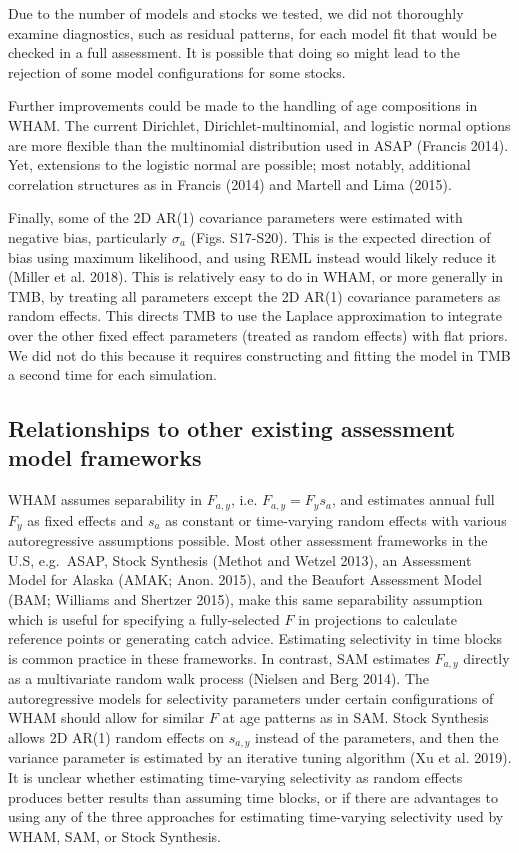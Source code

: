 \documentclass[]{article}
\begin{document}
Due to the number of models and stocks we tested, we did not thoroughly
examine diagnostics, such as residual patterns, for each model fit that
would be checked in a full assessment. It is possible that doing so
might lead to the rejection of some model configurations for some
stocks.

Further improvements could be made to the handling of age compositions
in WHAM. The current Dirichlet, Dirichlet-multinomial, and logistic
normal options are more flexible than the multinomial distribution used
in ASAP (Francis 2014). Yet, extensions to the logistic normal are
possible; most notably, additional correlation structures as in Francis
(2014) and Martell and Lima (2015).

Finally, some of the 2D AR(1) covariance parameters were estimated with
negative bias, particularly \(\sigma_a\) (Figs. S17-S20). This is the
expected direction of bias using maximum likelihood, and using REML
instead would likely reduce it (Miller et al. 2018). This is relatively
easy to do in WHAM, or more generally in TMB, by treating all parameters
except the 2D AR(1) covariance parameters as random effects. This
directs TMB to use the Laplace approximation to integrate over the other
fixed effect parameters (treated as random effects) with flat priors. We
did not do this because it requires constructing and fitting the model
in TMB a second time for each simulation.

\hypertarget{relationships-to-other-existing-assessment-model-frameworks}{%
\subsection{Relationships to other existing assessment model
frameworks}\label{relationships-to-other-existing-assessment-model-frameworks}}

WHAM assumes separability in \(F_{a,y}\), i.e. \(F_{a,y} = F_y s_a\),
and estimates annual full \(F_y\) as fixed effects and \(s_a\) as
constant or time-varying random effects with various autoregressive
assumptions possible. Most other assessment frameworks in the U.S,
e.g.~ASAP, Stock Synthesis (Methot and Wetzel 2013), an Assessment Model
for Alaska (AMAK; Anon. 2015), and the Beaufort Assessment Model (BAM;
Williams and Shertzer 2015), make this same separability assumption
which is useful for specifying a fully-selected \(F\) in projections to
calculate reference points or generating catch advice. Estimating
selectivity in time blocks is common practice in these frameworks. In
contrast, SAM estimates \(F_{a,y}\) directly as a multivariate random
walk process (Nielsen and Berg 2014). The autoregressive models for
selectivity parameters under certain configurations of WHAM should allow
for similar \(F\) at age patterns as in SAM. Stock Synthesis allows 2D
AR(1) random effects on \(s_{a,y}\) instead of the parameters, and then
the variance parameter is estimated by an iterative tuning algorithm (Xu
et al. 2019). It is unclear whether estimating time-varying selectivity
as random effects produces better results than assuming time blocks, or
if there are advantages to using any of the three approaches for
estimating time-varying selectivity used by WHAM, SAM, or Stock
Synthesis.
\end{document}
